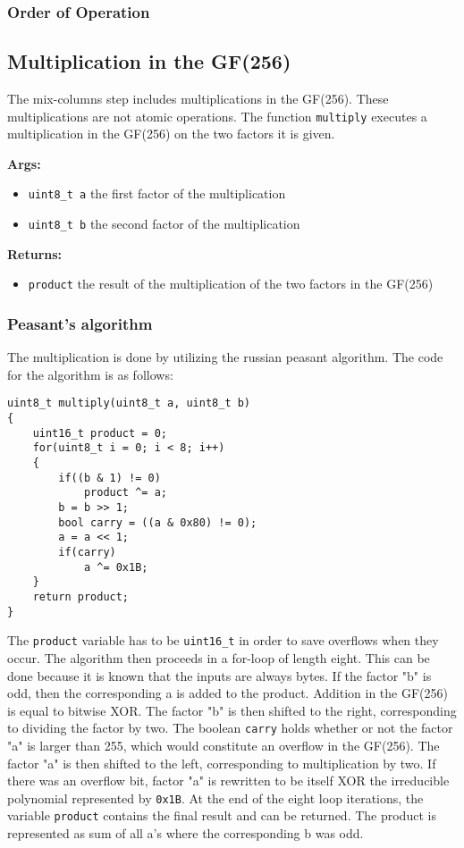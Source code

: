\subsubsection{Order of Operation}


\subsection{Multiplication in the GF(256)}
\label{ch:dec_multiplication}
The mix-columns step includes multiplications in the GF(256). These multiplications are not atomic operations. The function \lstinline{multiply} executes a multiplication in the GF(256) on the two factors it is given.

\textbf{Args:}
\begin{itemize}
  \item \lstinline{uint8_t a} the first factor of the multiplication
  \item \lstinline{uint8_t b} the second factor of the multiplication
\end{itemize}

\textbf{Returns:}
\begin{itemize}
  \item \lstinline{product} the result of the multiplication of the two factors in the GF(256)
\end{itemize}

\subsubsection{Peasant's algorithm}
The multiplication is done by utilizing the russian peasant algorithm. The code for the algorithm is as follows:
\begin{lstlisting}
uint8_t multiply(uint8_t a, uint8_t b)
{
    uint16_t product = 0;
    for(uint8_t i = 0; i < 8; i++)
    {
        if((b & 1) != 0)
            product ^= a;
        b = b >> 1;
        bool carry = ((a & 0x80) != 0);
        a = a << 1;
        if(carry)
            a ^= 0x1B;
    }
    return product;
}
\end{lstlisting}

The \lstinline{product} variable has to be \lstinline{uint16_t} in order to save overflows when they occur. The algorithm then proceeds in a for-loop of length eight. This can be done because it is known that the inputs are always bytes. If the factor "b" is odd, then the corresponding a is added to the product. Addition in the GF(256) is equal to bitwise XOR. The factor "b" is then shifted to the right, corresponding to dividing the factor by two. The boolean \lstinline{carry} holds whether or not the factor "a" is larger than 255, which would constitute an overflow in the GF(256). The factor "a" is then shifted to the left, corresponding to multiplication by two. If there was an overflow bit, factor "a" is rewritten to be itself XOR the irreducible polynomial represented by \lstinline{0x1B}. At the end of the eight loop iterations, the variable \lstinline{product} contains the final result and can be returned. The product is represented as sum of all a's where the corresponding b was odd.

